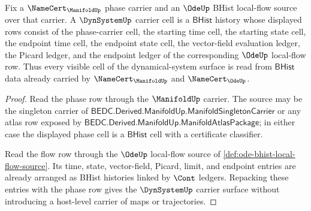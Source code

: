 \begin{theorem}
\label{thm:dynsystem-carrier-flow-surface}
Fix a $\NameCert_{\ManifoldUp}$ phase carrier and an $\OdeUp$ BHist
local-flow source over that carrier. A $\DynSystemUp$ carrier cell is a
$\mathsf{BHist}$ history whose displayed rows consist of the phase-carrier
cell, the starting time cell, the starting state cell, the endpoint time cell,
the endpoint state cell, the vector-field evaluation ledger, the Picard
ledger, and the endpoint ledger of the corresponding $\OdeUp$ local-flow row.
Thus every visible cell of the dynamical-system surface is read from
$\mathsf{BHist}$ data already carried by $\NameCert_{\ManifoldUp}$ and
$\NameCert_{\OdeUp}$.
\end{theorem}
\begin{proof}
Read the phase row through the $\ManifoldUp$ carrier. The source may be the
singleton carrier of $\mathsf{BEDC.Derived.ManifoldUp.ManifoldSingletonCarrier}$
or any atlas row exposed by
$\mathsf{BEDC.Derived.ManifoldUp.ManifoldAtlasPackage}$; in either case the
displayed phase cell is a $\mathsf{BHist}$ cell with a certificate classifier.

Read the flow row through the $\OdeUp$ local-flow source of
\autoref{def:ode-bhist-local-flow-source}. Its time, state, vector-field,
Picard, limit, and endpoint entries are already arranged as BHist histories
linked by $\Cont$ ledgers. Repacking these entries with the phase row gives
the $\DynSystemUp$ carrier surface without introducing a host-level carrier of
maps or trajectories.
\end{proof}

